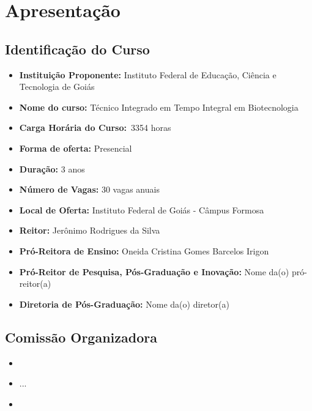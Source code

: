 \documentclass[11pt,fleqn]{book} %
\newcommand{\VER}[1]{\begingroup\color{red}#1\endgroup}
\begin{document}
\renewcommand\contentsname{Sumário}
\tableofcontents

\chapter{Apresentação}
\vspace{6em}
\begin{flushright}
	\textit{ }
\end{flushright}
\vspace{12em}
\indent


\section{Identificação do Curso}
\begin{itemize}
	\item \textbf{Instituição Proponente:} Instituto Federal de Educação, Ciência e Tecnologia de Goiás
	\item \textbf{Nome do curso:} Técnico Integrado em Tempo Integral em Biotecnologia
	\item \textbf{Carga Horária do Curso:}~\VER{3354} horas
	\item \textbf{Forma de oferta:} Presencial
	\item \textbf{Duração:} 3 anos
	\item \textbf{Número de Vagas:} 30 vagas anuais
	\item \textbf{Local de Oferta:} Instituto Federal de Goiás - Câmpus Formosa
	\item \textbf{Reitor:} Jerônimo Rodrigues da Silva
	\item \textbf{Pró-Reitora de Ensino:} Oneida Cristina Gomes Barcelos Irigon
	\item \textbf{Pró-Reitor de Pesquisa, Pós-Graduação e Inovação:} \VER{Nome da(o) pró-reitor(a)}
	\item \textbf{Diretoria de Pós-Graduação:} \VER{Nome da(o) diretor(a)}
\end{itemize}

\newpage  
\section{Comissão Organizadora}
	\begin{itemize}[label=\bfseries]
		\item {}
		\item ...
		\item {}
	\end{itemize}
\end{document}
